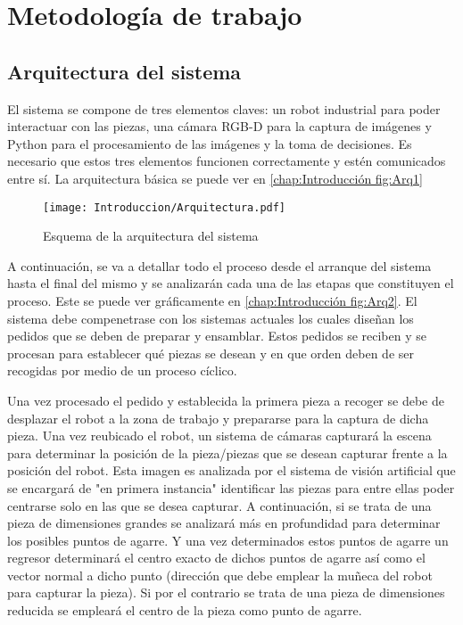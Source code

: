 \chapter{Metodología de trabajo}
\label{chap:Metodologia de trabajo}

\section{Arquitectura del sistema}
\label{chap:Introducción sec:Arquitectura}
El sistema se compone de tres elementos claves: un robot industrial para poder interactuar con las piezas, una cámara RGB-D para la captura de imágenes y Python para el procesamiento de las imágenes y la toma de decisiones. Es necesario que estos tres elementos funcionen correctamente y estén comunicados entre sí. La arquitectura básica se puede ver en \autoref{chap:Introducción fig:Arq1}

\begin{figure}[h]
	\centering
	\texttt{[image: Introduccion/Arquitectura.pdf]}
	\caption{Esquema de la arquitectura del sistema}
	\label{chap:Introducción fig:Arq1}
	\vspace{-5pt}
\end{figure}

A continuación, se va a detallar todo el proceso desde el arranque del sistema hasta el final del mismo y se analizarán cada una de las etapas que constituyen el proceso. Este se puede ver gráficamente en \autoref{chap:Introducción fig:Arq2}. El sistema debe compenetrase con los sistemas actuales los cuales diseñan los pedidos que se deben de preparar y ensamblar. Estos pedidos se reciben y se procesan para establecer qué piezas se desean y en que orden deben de ser recogidas por medio de un proceso cíclico.

Una vez procesado el pedido y establecida la primera pieza a recoger se debe de desplazar el robot a la zona de trabajo y prepararse  para la captura de dicha pieza. Una vez reubicado el robot, un sistema de cámaras capturará la escena para determinar la posición de la pieza/piezas que se desean capturar frente a la posición del robot. Esta imagen es analizada por el sistema de visión artificial que se encargará de "en primera instancia" identificar las piezas para entre ellas poder centrarse solo en las que se desea capturar. A continuación, si se trata de una pieza de dimensiones grandes se analizará más en profundidad para determinar los posibles puntos de agarre. Y una vez determinados estos puntos de agarre un regresor determinará el centro exacto de dichos puntos de agarre así como el vector normal a dicho punto (dirección que debe emplear la muñeca del robot para capturar la pieza). Si por el contrario se trata de una pieza de dimensiones reducida se empleará el centro de la pieza como punto de agarre.

